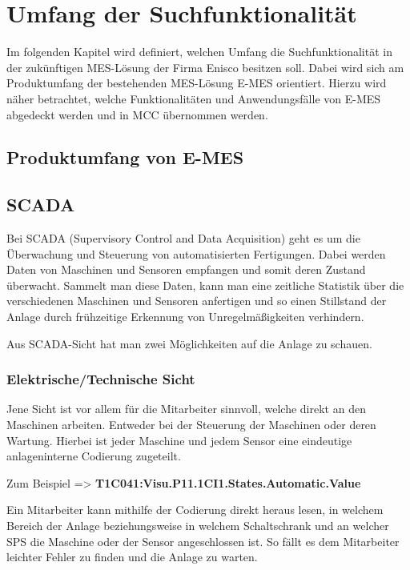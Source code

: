 \chapter{Umfang der Suchfunktionalität\label{chap3:Drittes-Kapitel}}

Im folgenden Kapitel wird definiert, welchen Umfang die Suchfunktionalität in der zukünftigen MES-Lösung der Firma Enisco besitzen soll. Dabei wird sich am Produktumfang der bestehenden MES-Lösung E-MES orientiert. Hierzu wird näher betrachtet, welche Funktionalitäten und Anwendungsfälle von E-MES abgedeckt werden und in MCC übernommen werden. 

\section{Produktumfang von E-MES\label{sec3.1:unterpunkt-1}}

\section{SCADA\label{sec3.1:unterpunkt-1}}
Bei SCADA (Supervisory Control and Data Acquisition) geht es um die Überwachung und Steuerung von automatisierten Fertigungen. Dabei werden Daten von Maschinen und Sensoren empfangen und somit deren Zustand überwacht. Sammelt man diese Daten, kann man eine zeitliche Statistik über die verschiedenen Maschinen und Sensoren anfertigen und so einen Stillstand der Anlage durch frühzeitige Erkennung von Unregelmäßigkeiten verhindern.

Aus SCADA-Sicht hat man zwei Möglichkeiten auf die Anlage zu schauen.

\subsection{Elektrische/Technische Sicht\label{subsec3.1.1:Unterunterpunkt-1}}
Jene Sicht ist vor allem für die Mitarbeiter sinnvoll, welche direkt an den Maschinen arbeiten. Entweder bei der Steuerung der Maschinen oder deren Wartung. Hierbei ist jeder Maschine und jedem Sensor eine eindeutige anlageninterne Codierung zugeteilt.

Zum Beispiel => \textbf{T1C041:Visu.P11.1CI1.States.Automatic.Value}

Ein Mitarbeiter kann mithilfe der Codierung direkt heraus lesen, in welchem Bereich der Anlage beziehungsweise in welchem Schaltschrank und an welcher SPS die Maschine oder der Sensor angeschlossen ist. So fällt es dem Mitarbeiter leichter Fehler zu finden und die Anlage zu warten.

